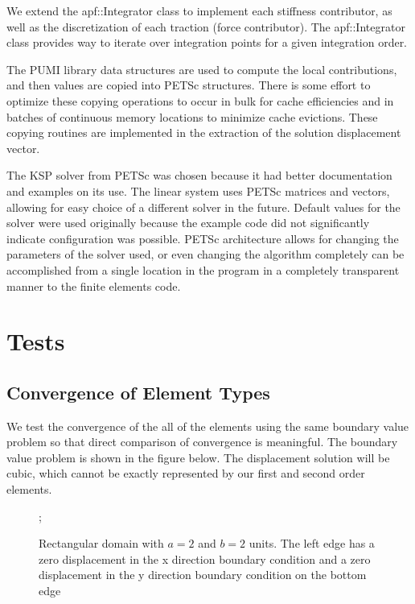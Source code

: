\documentclass{article}
\begin{document}
We extend the apf::Integrator class to implement each stiffness contributor, as well as the discretization of each traction (force contributor). The apf::Integrator class provides way to iterate over integration points for a given integration order.

The PUMI library data structures are used to compute the local contributions, and then values are copied into PETSc structures. There is some effort to optimize these copying operations to occur in bulk for cache efficiencies and in batches of continuous memory locations to minimize cache evictions. These copying routines are implemented in the extraction of the solution displacement vector.


The KSP solver from PETSc was chosen because it had better documentation and examples on its use. The linear system uses PETSc matrices and vectors, allowing for easy choice of a different solver in the future. Default values for the solver were used originally because the example code did not significantly indicate configuration was possible. PETSc architecture allows for changing the parameters of the solver used, or even changing the algorithm completely can be accomplished from a single location in the program in a completely transparent manner to the finite elements code.

\section{Tests}
\subsection{Convergence of Element Types}
\FloatBarrier
We test the convergence of the all of the elements using the same boundary value problem so that direct comparison of convergence is meaningful. The boundary value problem is shown in the figure below. The displacement solution will be cubic, which cannot be exactly represented by our first and second order elements. 


\begin{figure}
    ;
    \caption{Rectangular domain with $a=2$ and $b=2$ units. The left edge has a zero displacement in the x direction boundary condition and a zero displacement in the y direction boundary condition on the bottom edge}
\centering
\end{figure}
\end{document}
